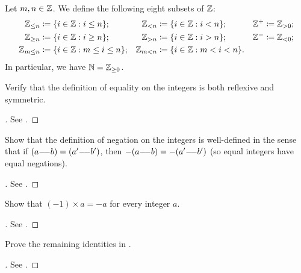 \begin{ac}\label{i:ac:4.1.9}
  Let \(m, n \in \mathbb{Z}\).
  We define the following eight subsets of \(\mathbb{Z}\):
  \begin{align*}
    \Z_{\leq n}   & \coloneqq \set{i \in \Z : i \leq n};        & \Z_{< n}   & \coloneqq \set{i \in \Z : i < n};     & \Z^+ & \coloneqq \Z_{> 0}; \\
    \Z_{\geq n}   & \coloneqq \set{i \in \Z : i \geq n};        & \Z_{> n}   & \coloneqq \set{i \in \Z : i > n};     & \Z^- & \coloneqq \Z_{< 0}; \\
    \Z_{m \leq n} & \coloneqq \set{i \in \Z : m \leq i \leq n}; & \Z_{m < n} & \coloneqq \set{i \in \Z : m < i < n}. &      &
  \end{align*}
  In particular, we have \(\mathbb{N} = \mathbb{Z}_{\geq 0}\).
\end{ac}

\exercisesection

\begin{ex}\label{i:ex:4.1.1}
  Verify that the definition of equality on the integers is both reflexive and symmetric.
\end{ex}

\begin{proof}[]
  See .
\end{proof}

\begin{ex}\label{i:ex:4.1.2}
  Show that the definition of negation on the integers is well-defined in the sense that if \((a {-}\!{-} b) = (a' {-}\!{-} b')\), then \(-(a {-}\!{-} b) = -(a' {-}\!{-} b')\)
  (so equal integers have equal negations).
\end{ex}

\begin{proof}[]
  See .
\end{proof}

\begin{ex}\label{i:ex:4.1.3}
  Show that \((-1) \times a = -a\) for every integer \(a\).
\end{ex}

\begin{proof}[]
  See .
\end{proof}

\begin{ex}\label{i:ex:4.1.4}
  Prove the remaining identities in .
\end{ex}

\begin{proof}[]
  See .
\end{proof}

